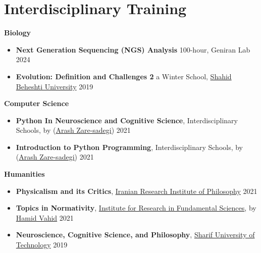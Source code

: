 \documentclass[letterpaper,11pt]{article} %
\begin{document}
\section{Interdisciplinary Training}

\textbf{Biology}
\vspace{-0.5\baselineskip}
\begin{itemize}
\item \textbf{Next Generation Sequencing (NGS) Analysis} 100-hour, \footnotesize Geniran Lab \hfill 2024 \normalsize

	\item \textbf{Evolution: Definition and Challenges 2} a Winter School, \footnotesize \href{https://en.sbu.ac.ir/}{Shahid Beheshti University} \hfill 2019 \normalsize
\end{itemize}

\textbf{Computer Science}
\vspace{-0.5\baselineskip}
\begin{itemize}
	\item \textbf{Python In Neuroscience and Cognitive Science}, \footnotesize Interdisciplinary Schools, by (\href{https://scholar.google.com/citations?user=8ccNIG8AAAAJ}{Arash Zare-sadegi}) \hfill 2021\normalsize

	\item \textbf{Introduction to Python Programming}, \footnotesize Interdisciplinary Schools, by (\href{https://scholar.google.com/citations?user=8ccNIG8AAAAJ}{Arash Zare-sadegi}) \hfill 2021\normalsize
\end{itemize}


\textbf{Humanities}
\vspace{-0.5\baselineskip}
\begin{itemize}
\item \textbf{Physicalism and its Critics}, \footnotesize \href{https://www.irip.ac.ir/en/home}{Iranian Research Institute of Philosophy} \hfill 2021 \normalsize
\item  \textbf{Topics in Normativity}, \footnotesize \href{https://www.ipm.ac.ir/}{Institute for Research in Fundamental Sciences}, by \href{https://scholar.google.com/citations?user=0Gj1NrcAAAAJ&hl=en&oi=ao}{Hamid Vahid}  \hfill 2021\normalsize
\item \textbf{Neuroscience, Cognitive Science, and Philosophy}, \footnotesize \href{https://en.sharif.edu/}{Sharif University of Technology} \hfill 2019 \normalsize
\end{itemize}
\end{document}
